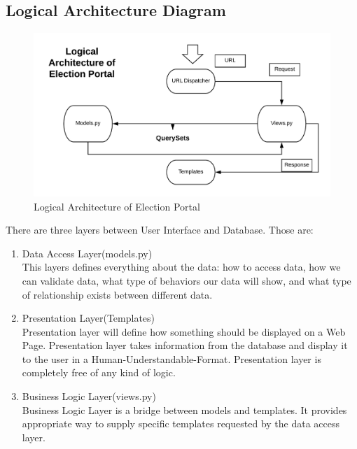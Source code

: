 \documentclass[12pt, a4paper, titlepage]{article}
\begin{document}
\subsection{Logical Architecture Diagram}
\begin{figure}
\begin{center}
\includegraphics[scale=0.8]{Logical_Architecture.png}
\caption{Logical Architecture of Election Portal}
\end{center}
\end{figure}
There are three layers between User Interface and Database. Those are:
\begin{enumerate}
\item Data Access Layer(models.py)\\
This layers defines everything about the data: how to access data, how we can validate data, what type of behaviors our data will show, and what type of relationship exists between different data.
\item Presentation Layer(Templates)\\
Presentation layer will define how something should be displayed on a Web Page. Presentation layer takes information from the database and display it to the user in a Human-Understandable-Format. Presentation layer is completely free of any kind of logic.
\item Business Logic Layer(views.py)\\
Business Logic Layer is a bridge between models and templates. It provides appropriate way to supply specific templates requested by the data access layer.
\end{enumerate}
\newpage
\end{document}
